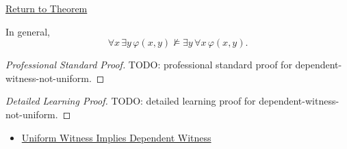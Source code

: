 \newpage
{}
\label{prf:dependent-witness-not-uniform}

\begin{remark*}[Return]
\hyperref[thm:dependent-witness-not-uniform]{Return to Theorem}
\end{remark*}

\begin{theorem*}
In general,
\[
\forall x\,\exists y\,\varphi(x,y)
\not\models
\exists y\,\forall x\,\varphi(x,y).
\]
\end{theorem*}

\begin{proof}[Professional Standard Proof]
\LRAProofBodyStart
TODO: professional standard proof for dependent-witness-not-uniform.
\end{proof}

\begin{proof}[Detailed Learning Proof]
\LRAProofBodyStart
TODO: detailed learning proof for dependent-witness-not-uniform.
\end{proof}

\begin{remark*}
\end{remark*}

\begin{dependencies}
\begin{itemize}
  \item \hyperref[thm:uniform-witness-implies-dependent-witness]{Uniform Witness Implies Dependent Witness}
\end{itemize}
\end{dependencies}

\clearpage

